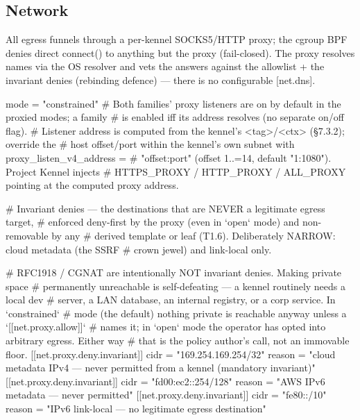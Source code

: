 \hypertarget{network}{%
\subsection{Network}\label{network}}

All egress funnels through a per-kennel SOCKS5/HTTP proxy; the cgroup
BPF denies direct connect() to anything but the proxy (fail-closed). The
proxy resolves names via the OS resolver and vets the answers against
the allowlist + the invariant denies (rebinding defence) --- there is no
configurable {[}net.dns{]}.

\begin{kennelcode}
[net]
mode = "constrained"
# Both families' proxy listeners are on by default in the proxied modes; a family
# is enabled iff its address resolves (no separate on/off flag).
# Listener address is computed from the kennel's <tag>/<ctx> (§7.3.2); override the
# host offset/port within the kennel's own subnet with proxy_listen_v4_address =
# "offset:port" (offset 1..=14, default "1:1080"). Project Kennel injects
# HTTPS_PROXY / HTTP_PROXY / ALL_PROXY pointing at the computed proxy address.
\end{kennelcode}

\begin{kennelcode}
# Invariant denies — the destinations that are NEVER a legitimate egress target,
# enforced deny-first by the proxy (even in `open` mode) and non-removable by any
# derived template or leaf (T1.6). Deliberately NARROW: cloud metadata (the SSRF
# crown jewel) and link-local only.
\end{kennelcode}

\begin{kennelcode}
# RFC1918 / CGNAT are intentionally NOT invariant denies. Making private space
# permanently unreachable is self-defeating — a kennel routinely needs a local dev
# server, a LAN database, an internal registry, or a corp service. In `constrained`
# mode (the default) nothing private is reachable anyway unless a `[[net.proxy.allow]]`
# names it; in `open` mode the operator has opted into arbitrary egress. Either way
# that is the policy author's call, not an immovable floor.
[[net.proxy.deny.invariant]]
cidr = "169.254.169.254/32"
reason = "cloud metadata IPv4 — never permitted from a kennel (mandatory invariant)"
[[net.proxy.deny.invariant]]
cidr = "fd00:ec2::254/128"
reason = "AWS IPv6 metadata — never permitted"
[[net.proxy.deny.invariant]]
cidr = "fe80::/10"
reason = "IPv6 link-local — no legitimate egress destination"
\end{kennelcode}

